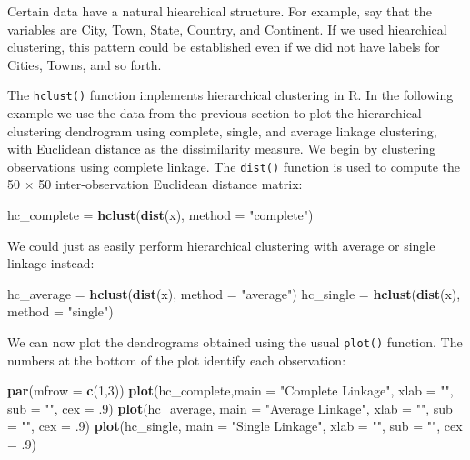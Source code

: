\documentclass[
  openany]{book}
\newenvironment{Shaded}{\begin{snugshade}}{\end{snugshade}}
\newcommand{\DataTypeTok}[1]{\textcolor[rgb]{0.13,0.29,0.53}{#1}}
\newcommand{\DecValTok}[1]{\textcolor[rgb]{0.00,0.00,0.81}{#1}}
\newcommand{\FloatTok}[1]{\textcolor[rgb]{0.00,0.00,0.81}{#1}}
\newcommand{\KeywordTok}[1]{\textcolor[rgb]{0.13,0.29,0.53}{\textbf{#1}}}
\newcommand{\NormalTok}[1]{#1}
\newcommand{\StringTok}[1]{\textcolor[rgb]{0.31,0.60,0.02}{#1}}
\begin{document}
Certain data have a natural hiearchical structure. For example, say that the variables are City, Town, State, Country, and Continent. If we used hiearchical clustering, this pattern could be established even if we did not have labels for Cities, Towns, and so forth.

The \texttt{hclust()} function implements hierarchical clustering in R. In the following example we use the data from the previous section to plot the hierarchical
clustering dendrogram using complete, single, and average linkage clustering,
with Euclidean distance as the dissimilarity measure. We begin by
clustering observations using complete linkage. The \texttt{dist()} function is used
to compute the 50 \(\times\) 50 inter-observation Euclidean distance matrix:

\begin{Shaded}
\begin{Highlighting}[]
\NormalTok{hc_complete =}\StringTok{ }\KeywordTok{hclust}\NormalTok{(}\KeywordTok{dist}\NormalTok{(x), }\DataTypeTok{method =} \StringTok{"complete"}\NormalTok{)}
\end{Highlighting}
\end{Shaded}

We could just as easily perform hierarchical clustering with average or
single linkage instead:

\begin{Shaded}
\begin{Highlighting}[]
\NormalTok{hc_average =}\StringTok{ }\KeywordTok{hclust}\NormalTok{(}\KeywordTok{dist}\NormalTok{(x), }\DataTypeTok{method =} \StringTok{"average"}\NormalTok{)}
\NormalTok{hc_single =}\StringTok{ }\KeywordTok{hclust}\NormalTok{(}\KeywordTok{dist}\NormalTok{(x), }\DataTypeTok{method =} \StringTok{"single"}\NormalTok{)}
\end{Highlighting}
\end{Shaded}

We can now plot the dendrograms obtained using the usual \texttt{plot()} function.
The numbers at the bottom of the plot identify each observation:

\begin{Shaded}
\begin{Highlighting}[]
\KeywordTok{par}\NormalTok{(}\DataTypeTok{mfrow =} \KeywordTok{c}\NormalTok{(}\DecValTok{1}\NormalTok{,}\DecValTok{3}\NormalTok{))}
\KeywordTok{plot}\NormalTok{(hc_complete,}\DataTypeTok{main =} \StringTok{"Complete Linkage"}\NormalTok{, }\DataTypeTok{xlab =} \StringTok{""}\NormalTok{, }\DataTypeTok{sub =} \StringTok{""}\NormalTok{, }\DataTypeTok{cex =} \FloatTok{.9}\NormalTok{)}
\KeywordTok{plot}\NormalTok{(hc_average, }\DataTypeTok{main =} \StringTok{"Average Linkage"}\NormalTok{, }\DataTypeTok{xlab =} \StringTok{""}\NormalTok{, }\DataTypeTok{sub =} \StringTok{""}\NormalTok{, }\DataTypeTok{cex =} \FloatTok{.9}\NormalTok{)}
\KeywordTok{plot}\NormalTok{(hc_single, }\DataTypeTok{main =} \StringTok{"Single Linkage"}\NormalTok{, }\DataTypeTok{xlab =} \StringTok{""}\NormalTok{, }\DataTypeTok{sub =} \StringTok{""}\NormalTok{, }\DataTypeTok{cex =} \FloatTok{.9}\NormalTok{)}
\end{Highlighting}
\end{Shaded}
\end{document}
